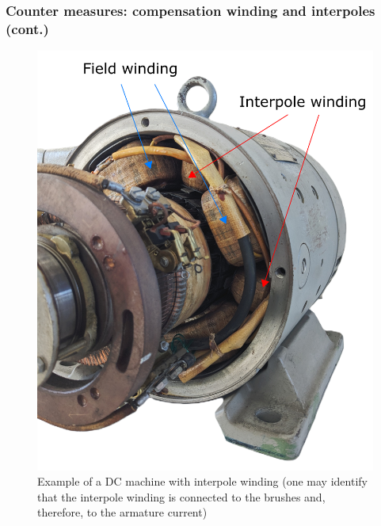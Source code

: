 \begin{frame}
	\frametitle{Counter measures: compensation winding and interpoles (cont.)}
    \begin{figure}
        \centering
        \includegraphics[height=0.70\textheight]{fig/lec03/Interpole_winding_example.png}
        \caption{Example of a DC machine with interpole winding (one may identify that the interpole winding is connected to the brushes and, therefore, to the armature current)}
		\label{fig:Interpole_winding_example}
    \end{figure}
\end{frame}

